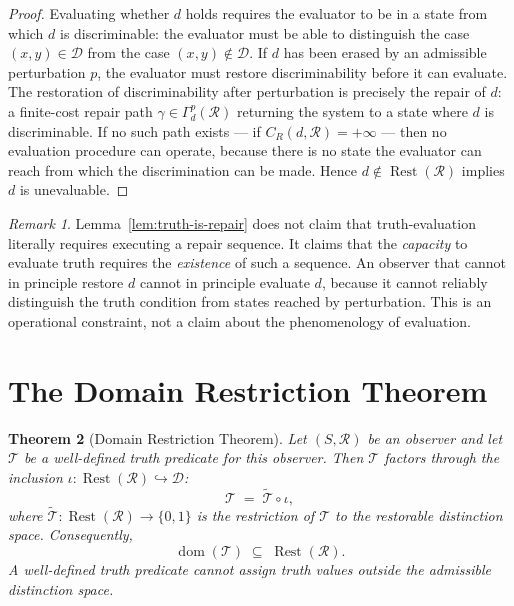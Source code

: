 \documentclass[12pt, oneside]{article}
\theoremstyle{plain}
\newtheorem{theorem}{Theorem}[section]
\theoremstyle{definition}
\theoremstyle{remark}
\newtheorem{remark}[theorem]{Remark}
\DeclareMathOperator{\Rest}{Rest}
\newcommand{\CR}{C_{\!R}}
\newcommand{\Dsub}{\mathcal{D}}
\newcommand{\Tsub}{\mathcal{T}}
\newcommand{\Ttilde}{\widetilde{\mathcal{T}}}
\newcommand{\iotamap}{\iota}        %
\newcommand{\RestR}{\Rest(\mathcal{R})}
\begin{document}
\begin{proof}
  Evaluating whether $d$ holds requires the evaluator to be in a
  state from which $d$ is discriminable: the evaluator must be
  able to distinguish the case $(x,y) \in \Dsub$ from the case
  $(x,y) \notin \Dsub$.
  If $d$ has been erased by an admissible perturbation $p$, the
  evaluator must restore discriminability before it can evaluate.
  The restoration of discriminability after perturbation is
  precisely the repair of $d$: a finite-cost repair path
  $\gamma \in \Gamma_d^p(\mathcal{R})$ returning the system to
  a state where $d$ is discriminable.
  If no such path exists --- if $\CR(d, \mathcal{R}) = +\infty$
  --- then no evaluation procedure can operate, because there is
  no state the evaluator can reach from which the discrimination
  can be made.
  Hence $d \notin \RestR$ implies $d$ is unevaluable.
\end{proof}

\begin{remark}
  Lemma~\ref{lem:truth-is-repair} does not claim that
  truth-evaluation literally requires executing a repair sequence.
  It claims that the \emph{capacity} to evaluate truth requires
  the \emph{existence} of such a sequence.
  An observer that cannot in principle restore $d$ cannot in
  principle evaluate $d$, because it cannot reliably distinguish
  the truth condition from states reached by perturbation.
  This is an operational constraint, not a claim about the
  phenomenology of evaluation.
\end{remark}


\section{The Domain Restriction Theorem}
\label{sec:domain}

\begin{theorem}[Domain Restriction Theorem]
  Let $(S, \mathcal{R})$ be an observer and let $\Tsub$ be a
  well-defined truth predicate for this observer.
  Then $\Tsub$ factors through the inclusion
  $\iotamap: \RestR \hookrightarrow \Dsub$:
  \[
    \Tsub \;=\; \Ttilde \circ \iotamap,
  \]
  where $\Ttilde: \RestR \to \{0, 1\}$ is the restriction of
  $\Tsub$ to the restorable distinction space.
  Consequently,
  \[
    \operatorname{dom}(\Tsub) \;\subseteq\; \RestR.
  \]
  A well-defined truth predicate cannot assign truth values outside
  the admissible distinction space.
  \label{thm:domain-restriction}
\end{theorem}
\end{document}
